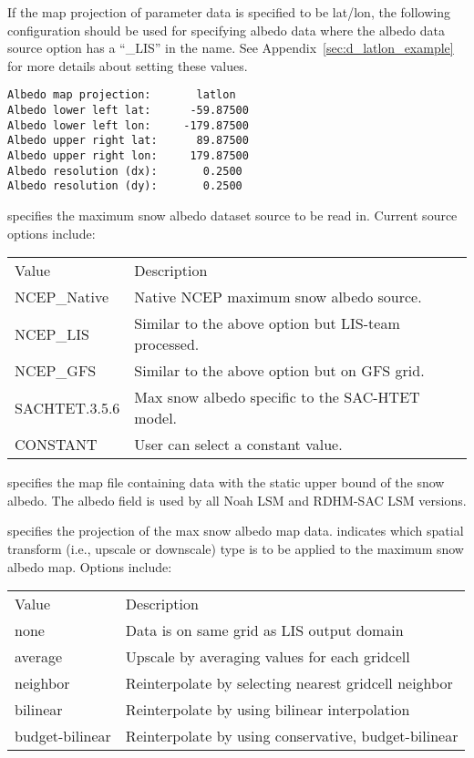  
 If the map projection of parameter data is specified to be lat/lon, 
 the following configuration should be used for specifying albedo data
 where the albedo data source option has a ``\_LIS'' in the name.
 See Appendix~\ref{sec:d_latlon_example} for more details about
 setting these values.
  

 \begin{Verbatim}[frame=single]
Albedo map projection:       latlon
Albedo lower left lat:      -59.87500
Albedo lower left lon:     -179.87500
Albedo upper right lat:      89.87500
Albedo upper right lon:     179.87500
Albedo resolution (dx):       0.2500
Albedo resolution (dy):       0.2500
 \end{Verbatim}

 
  specifies the maximum snow albedo
 dataset source to be read in. Current source options include:

 \begin{tabular}{ll}
 Value         & Description    \\
 NCEP\_Native  &  Native NCEP maximum snow albedo source. \\
 NCEP\_LIS     &  Similar to the above option but LIS-team processed. \\
 NCEP\_GFS     &  Similar to the above option but on GFS grid. \\
 SACHTET.3.5.6 &  Max snow albedo specific to the SAC-HTET model. \\
 CONSTANT      &  User can select a constant value. \\
 \end{tabular}

  specifies the map file containing
 data with the static upper bound of the snow albedo.
  The albedo field is used by all Noah LSM and RDHM-SAC LSM versions.

  specifies the projection of the
 max snow albedo map data.
  indicates which spatial
 transform (i.e., upscale or downscale) type is to be applied
 to the maximum snow albedo map.  Options include:

 \begin{tabular}{ll}
 Value    & Description                                             \\
 none      & Data is on same grid as LIS output domain              \\
 average   & Upscale by averaging values for each gridcell          \\
 neighbor  & Reinterpolate by selecting nearest gridcell neighbor   \\
 bilinear  & Reinterpolate by using bilinear interpolation          \\
 budget-bilinear & Reinterpolate by using conservative, budget-bilinear \\
 \end{tabular}
 

